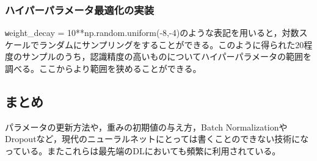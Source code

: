 \documentclass{jarticle}
\begin{document}
\subsubsection{ハイパーパラメータ最適化の実装}
{\texttt weight\_decay = 10**np.random.uniform(-8,-4)}のような表記を用いると，対数スケールでランダムにサンプリングをすることができる。このように得られた$20$程度のサンプルのうち，認識精度の高いものについてハイパーパラメータの範囲を調べる。ここからより範囲を狭めることができる。
\subsection{まとめ}
パラメータの更新方法や，重みの初期値の与え方，Batch NormalizationやDropoutなど，現代のニューラルネットにとっては書くことのできない技術になっている。またこれらは最先端のDLにおいても頻繁に利用されている。

\end{document}
